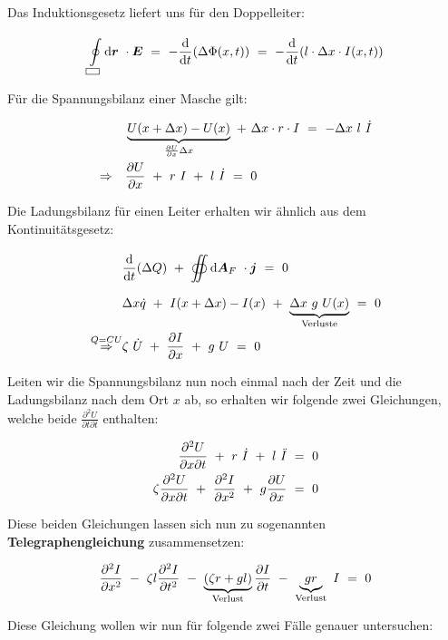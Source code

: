 Das Induktionsgesetz liefert uns für den Doppelleiter:

\begin{equation*}
\Oint{\rectangle}{}{\vec{r}}\cdot\vec{E} \ = \ - \diff{}{t} (\Delta\Phi(x,t))  \ = \ - \diff{}{t} (l \cdot \Delta x \cdot I(x,t))
\end{equation*}


Für die Spannungsbilanz einer Masche gilt:

\begin{align*}
& \underbrace{U(x+\Delta x) - U(x)}_{\pdiff{U}{x}\Delta x} \ + \ \Delta x \cdot r  \cdot I  \ = \ - \Delta x \ l \ \dot{I}\\
\Rightarrow\quad &\pdiff{U}{x} \ + \ r \ I \ + \ l \ \dot{I}  \ = \ 0
\end{align*}

Die Ladungsbilanz für einen Leiter erhalten wir ähnlich aus dem Kontinuitätsgesetz:

\begin{align*}
& \diff{}{t}(\Delta Q) \ + \ \Oiint{}{}{\vec{A}_F}\cdot\vec{j} \ = \ 0\\
& \Delta x \dot{q} \ + \ I(x+\Delta x)-I(x) \ + \ \underbrace{\Delta x \ g \ U(x)}_{\text{Verluste}} \ = \ 0\\
\overset{Q=CU}{\Rightarrow} & \zeta \ \dot{U} \ + \ \pdiff{I}{x} \ + \ g \ U  \ = \ 0
\end{align*}


Leiten wir die Spannungsbilanz nun noch einmal nach der Zeit und die  Ladungsbilanz nach dem Ort $x$ ab, so erhalten wir folgende zwei Gleichungen, welche beide $\frac{\partial^2 U}{\partial t \partial t}$ enthalten:

\begin{align*}
\frac{\partial^2 U}{\partial x \partial t} \ + \ r \ \dot{I} \ + \ l \ \ddot{I}  \ &= \ 0\\
\zeta\frac{\partial^2 U}{\partial x \partial t} \ + \ \pddiff{I}{x} \ + \ g \pdiff{U}{x}  \ &= \ 0
\end{align*}

Diese beiden Gleichungen lassen sich nun zu sogenannten \textbf{Telegraphengleichung} zusammensetzen:

\begin{equation*}
\frac{\partial ^2{I}}{\partial{x}^2} \ - \ \zeta l \frac{\partial ^2{I}}{\partial{t}^2} \ - \ \underbrace{\left(\zeta r + g l \right)}_{\text{Verlust}}\frac{\partial{I}}{\partial{t}} \ - \ \underbrace{g r}_{\text{Verlust}} \ I \ = \ 0
\end{equation*}


Diese Gleichung wollen wir nun für folgende zwei Fälle genauer untersuchen:

